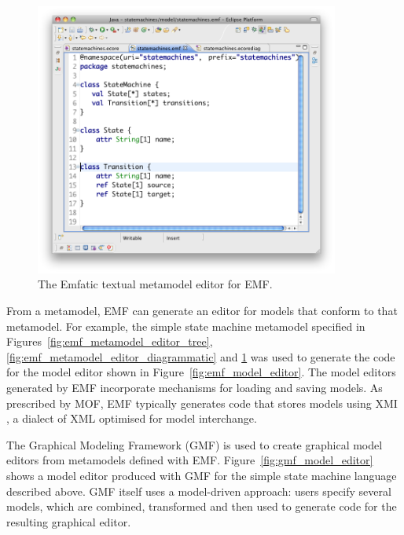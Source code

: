 \begin{figure}[htbp]
  \begin{center}
    \leavevmode
    \includegraphics[width=10cm]{2.Background/images/emf_metamodel_textual.png}
  \end{center}
  \caption{The Emfatic textual metamodel editor for EMF.}
  \label{fig:emf_metamodel_editor_textual}
\end{figure}

From a metamodel, EMF can generate an editor for models that conform to that metamodel. For example, the simple state machine metamodel specified in Figures~\ref{fig:emf_metamodel_editor_tree}, \ref{fig:emf_metamodel_editor_diagrammatic} and \ref{fig:emf_metamodel_editor_textual} was used to generate the code for the model editor shown in Figure~\ref{fig:emf_model_editor}. The model editors generated by EMF incorporate mechanisms for loading and saving models. As prescribed by MOF, EMF typically generates code that stores models using XMI \cite{xmi}, a dialect of XML optimised for model interchange.

The Graphical Modeling Framework (GMF) \cite{gronback09emp} is used to create graphical model editors from metamodels defined with EMF. Figure~\ref{fig:gmf_model_editor} shows a model editor produced with GMF for the simple state machine language described above. GMF itself uses a model-driven approach: users specify several models, which are combined, transformed and then used to generate code for the resulting graphical editor. 

